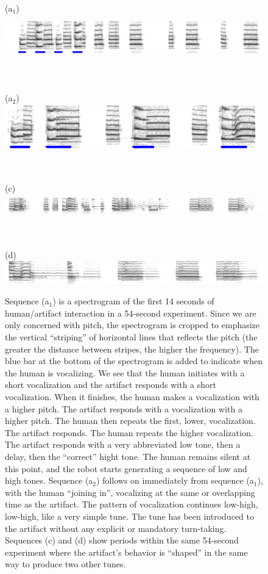 \begin{figure}[p]

\centerline{(a$_1$) \includegraphics[height=2cm]{images/chico-separate-begin-labelled}}

\ \\

\centerline{(a$_2$) \includegraphics[height=2cm]{images/chico-separate-together-labelled}}

\ \\

\centerline{(c) \includegraphics[height=1cm]{images/chico-pair}}

\ \\

\centerline{(d) \includegraphics[height=1cm]{images/chico-ohm}}


\caption{
%
\label{fig:sing-spectrogram}
%
Sequence (a$_1$) is a spectrogram of the first 14 seconds of human/artifact 
interaction in a 54-second experiment. 
Since we are only concerned with pitch, the 
spectrogram is cropped to emphasize the vertical ``striping'' of 
horizontal lines that reflects the pitch (the greater 
the distance between stripes, the higher the frequency).
The blue bar at the bottom of the spectrogram is added to 
indicate when the human is vocalizing.
%
We see that the human initiates with a short vocalization
and the artifact responds with a short vocalization.  When it
finishes, the human makes a vocalization with a higher pitch.
The artifact responds with a vocalization with a higher pitch.
The human then repeats the first, lower, vocalization.
The artifact responds.  The human repeats the higher vocalization.
The artifact responds with a very abbreviated low tone, then a delay,
then the ``correct'' hight tone.  The human remains silent at this
point, and the robot starts generating a sequence of low and high
tones.
%
Sequence (a$_2$) follows on immediately from sequence (a$_1$), with 
the human ``joining in'', vocalizing at the same or overlapping time 
as the artifact.  The pattern of vocalization continues low-high,
low-high, like a very simple tune.
%
The tune has been introduced to the artifact without any
explicit or mandatory turn-taking.
%
Sequences (c) and (d) show periods within the same 54-second experiment
where the artifact's behavior is ``shaped'' in the same way
to produce two other tunes.
}

\end{figure}



